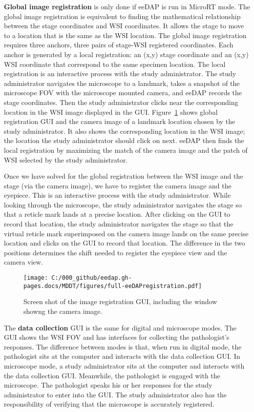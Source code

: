 \documentclass{article}%
\begin{document}
\textbf{Global image registration} is only done if eeDAP is run in MicroRT
mode. The global image registration is equivalent to finding the mathematical
relationship between the stage coordinates and WSI coordinates. It allows the
stage to move to a location that is the same as the WSI location. The global
image registration requires three anchors, three pairs of stage-WSI registered
coordinates. Each anchor is generated by a local registration: an (x,y) stage
coordinate and an (x,y) WSI coordinate that correspond to the same specimen
location. The local registration is an interactive process with the study
administrator. The study administrator navigates the microscope to a landmark,
takes a snapshot of the microscope FOV with the microscope mounted camera, and
eeDAP records the stage coordinates. Then the study administrator clicks near
the corresponding location in the WSI image displayed in the GUI.
Figure~\ref{fig_full-eeDAPregistration} shows global registration GUI and the
camera image of a landmark location chosen by the study administrator. It also
shows the corresponding location in the WSI image; the location the study
administrator should click on next. eeDAP then finds the local registration by
maximizing the match of the camera image and the patch of WSI selected by the
study administrator.

Once we have solved for the global registration between the WSI image and the
stage (via the camera image), we have to register the camera image and the
eyepiece. This is an interactive process with the study administrator. While
looking through the microscope, the study administrator navigates the stage so
that a reticle mark lands at a precise location. After clicking on the GUI to
record that location, the study administrator navigates the stage so that the
virtual reticle mark superimposed on the camera image lands on the same
precise location and clicks on the GUI to record that location. The difference
in the two positions determines the shift needed to register the eyepiece view
and the camera view.

\begin{figure}[ptbh]
\label{fig_full-eeDAPregistration}
\texttt{[image: C:/000\_github/eedap.gh-pages.docs/MDDT/figures/full-eeDAPregistration.pdf]}\caption{Screen
shot of the image registration GUI, including the window showng the camera
image.}%
\end{figure}

The \textbf{data collection} GUI is the same for digital and microscope modes.
The GUI shows the WSI FOV and has interfaces for collecting the pathologist's
responses. The difference between modes is that, when run in digital mode, the
pathologist sits at the computer and interacts with the data collection GUI.
In microscope mode, a study administrator sits at the computer and interacts
with the data collection GUI. Meanwhile, the pathologist is engaged with the
microscope. The pathologist speaks his or her responses for the study
administrator to enter into the GUI. The study administrator also has the
responsibility of verifying that the microscope is accurately registered.
\end{document}
